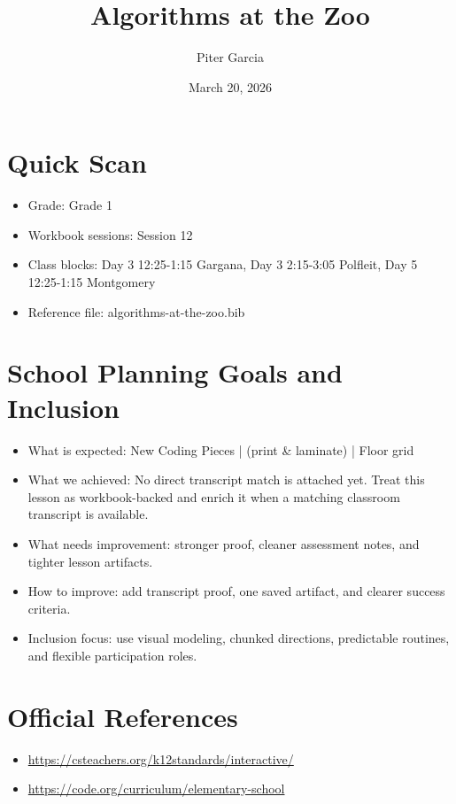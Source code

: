 \documentclass[11pt]{article}
\title{Algorithms at the Zoo}
\author{Piter Garcia}
\date{March 20, 2026}
\begin{document}
    \maketitle
    \section*{Quick Scan}
    \begin{itemize}[leftmargin=*]
    \item Grade: Grade 1
    \item Workbook sessions: Session 12
    \item Class blocks: Day 3 12:25-1:15 Gargana, Day 3 2:15-3:05 Polfleit, Day 5 12:25-1:15 Montgomery
    \item Reference file: algorithms-at-the-zoo.bib
    \end{itemize}
    \section*{School Planning Goals and Inclusion}
    \begin{itemize}[leftmargin=*]
    \item What is expected: New Coding Pieces | (print & laminate) | Floor grid
    \item What we achieved: No direct transcript match is attached yet. Treat this lesson as workbook-backed and enrich it when a matching classroom transcript is available.
    \item What needs improvement: stronger proof, cleaner assessment notes, and tighter lesson artifacts.
    \item How to improve: add transcript proof, one saved artifact, and clearer success criteria.
    \item Inclusion focus: use visual modeling, chunked directions, predictable routines, and flexible participation roles.
    \end{itemize}
    \section*{Official References}
    \begin{itemize}[leftmargin=*]
    \item \url{https://csteachers.org/k12standards/interactive/}
\item \url{https://code.org/curriculum/elementary-school}

    \end{itemize}
    
\end{document}
